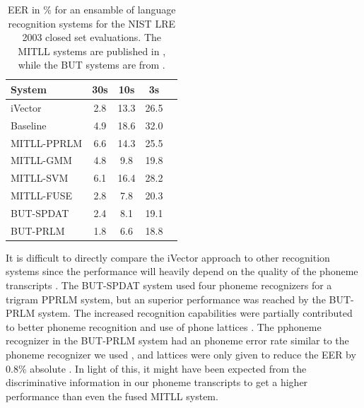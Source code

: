 \begin{table}[hbt!]
\begin{center}
\begin{tabular}{| l | c | c | c | c |}
\hline
System & 30s & 10s & 3s \\
\hline
iVector & 2.8 & 13.3 & 26.5 \\
Baseline & 4.9 & 18.6 & 32.0 \\
\hline
MITLL-PPRLM & 6.6 & 14.3 & 25.5 \\
MITLL-GMM & 4.8 & 9.8 & 19.8 \\
MITLL-SVM & 6.1 & 16.4 & 28.2 \\
MITLL-FUSE & 2.8 & 7.8 & 20.3 \\
\hline
BUT-SPDAT & 2.4 & 8.1 & 19.1 \\
BUT-PRLM &1.8 & 6.6 & 18.8 \\
\hline
\end{tabular}
\end{center}
\caption{EER in \% for an ensamble of language recognition systems for the NIST LRE 2003 closed set evaluations. The MITLL systems are published in \cite{singer2003acoustic}, while the BUT systems are from \cite{matejka2006use}.}
\label{tab:compdetresults}
\end{table}

It is difficult to directly compare the iVector approach to other recognition systems since the performance will heavily depend on the quality of the phoneme transcripts \cite[p. 64]{butphnrec}. The BUT-SPDAT system used four phoneme recognizers for a trigram PPRLM system, but an superior performance was reached by the BUT-PRLM system. The increased recognition capabilities were partially contributed to better phoneme recognition and use of phone lattices \cite{matejka2006use}. The pphoneme recognizer in the BUT-PRLM system had an phoneme error rate similar to the phoneme recognizer we used \cite[p. 58]{butphnrec}, and lattices were only given to reduce the EER by $0.8$\% absolute \cite{matejka2006use}.  In light of this, it might have been expected from the discriminative information in our phoneme transcripts to get a higher performance than even the fused MITLL system.







